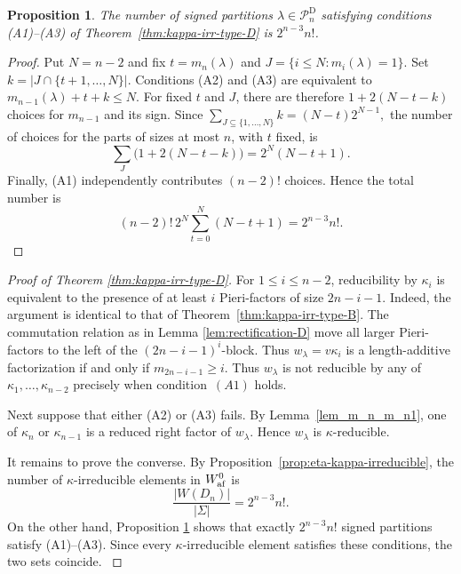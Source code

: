 \documentclass[a4paper]{amsart}
\newcommand{\ike}[1]{\todo[size=\tiny,color=blue!30]{#1}}
\newtheorem{prop}[thm]{Proposition}
\theoremstyle{remark}
\numberwithin{equation}{section}
\begin{document}
\begin{prop}\label{prop:count}
The number of signed partitions $\lambda\in \mathscr{P}_n^{\mathrm D}$
satisfying conditions {\rm(A1)--(A3)} of Theorem~\ref{thm:kappa-irr-type-D}
is $2^{n-3}n!$.
\end{prop}

\begin{proof}
Put $N=n-2$ and fix $t=m_n(\lambda)$ and
$J=\{i\le N:m_i(\lambda)=1\}$. Set
$k=|J\cap\{t+1,\ldots,N\}|$.
Conditions (A2) and (A3) are equivalent to
$
m_{n-1}(\lambda)+t+k\le N.
$
For fixed $t$ and $J$, there are therefore
$1+2(N-t-k)$ choices for $m_{n-1}$ and its sign.
Since
$
\sum_{J\subseteq\{1,\ldots,N\}}k
=(N-t)2^{N-1},
$
the number of choices for the parts of sizes
at most $n$, with $t$ fixed, is
\[
\sum_J\bigl(1+2(N-t-k)\bigr)
=2^N(N-t+1).
\]
Finally, (A1) independently contributes
$(n-2)!$ choices. Hence the total number is
\[
(n-2)!\,2^N\sum_{t=0}^N(N-t+1)
=2^{n-3}n!.
\]
\end{proof}

\begin{proof}[Proof of Theorem \ref{thm:kappa-irr-type-D}]
For \(1\leq i\leq n-2\), reducibility by \(\kappa_i\) is equivalent to the presence of at least \(i\) Pieri-factors of size \(2n-i-1\). Indeed, the argument is identical to that of Theorem~\ref{thm:kappa-irr-type-B}. The commutation relation as in Lemma \ref{lem:rectification-D} move all larger Pieri-factors to the left of the \((2n-i-1)^i\)-block. Thus $ w_\lambda=v\kappa_i $ is a length-additive factorization if and only if \(m_{2n-i-1}\geq i\). Thus $w_\lambda$ is not reducible by any of $\kappa_1,\ldots,\kappa_{n-2}$ precisely when condition~$(A1)$ holds.

{
Next suppose that either (A2) or (A3) fails.
By Lemma~\ref{lem_m_n_m_n1}, one of $\kappa_n$ or $\kappa_{n-1}$ is a reduced right factor
of $w_\lambda$.
Hence $w_\lambda$ is $\kappa$-reducible.
}

{
It remains to prove the converse. By Proposition~\ref{prop:eta-kappa-irreducible},
the number of $\kappa$-irreducible elements in
$W_{\mathrm{af}}^0$ is
\[
\frac{|W(D_n)|}{|\Sigma|}=2^{n-3}n!.
\]
On the other hand, Proposition \ref{prop:count} shows
that exactly $2^{n-3}n!$ signed partitions satisfy
(A1)--(A3). Since every $\kappa$-irreducible element
satisfies these conditions, the two sets coincide.
}
\end{proof}
\end{document}
